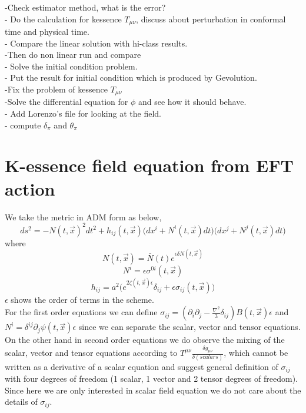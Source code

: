 \documentclass[a4paper,11pt]{article}
\def\be{\begin{equation}}
\def\ee{\end{equation}}
\begin{document}
-Check estimator method, what is the error? \\
- Do the calculation for  kessence $T_{\mu \nu}$, discuss about perturbation in conformal time and physical time. \\
- Compare the linear solution with hi-class results. \\
-Then do non linear run and compare \\
- Solve the initial condition problem. \\
- Put the result for initial condition which is produced by Gevolution. \\
-Fix the problem of kessence $T_{\mu \nu}$ \\
-Solve the differential equation for $\phi$ and see how it should behave. \\
- Add Lorenzo's file for looking at the field. \\
- compute $\delta_{\pi}$ and $\theta_{\pi}$ \\

 \section{K-essence field equation from EFT action}
 
 We take the metric in ADM form as below,
  \be
  ds^2= -N (t,\vec{x}) ^2 d t^2+ h_{ij } (t,\vec{x}) \Big( dx^i+N^i (t,\vec{x}) dt   \Big) \Big( dx^j+N^j (t,\vec{x}) dt   \Big)
  \ee
  where 
  \be
  N(t,\vec{x})= \bar{N} (t) e^{\epsilon \delta N (t,\vec{x})}
  \ee
  \be
  N^i=\epsilon \sigma^{0i} (t,\vec{x})
  \ee
  \be
    h_{ij}=a^2 \Big( e^{2 \zeta (t,\vec{x}) \epsilon} \delta_{ij} + \epsilon \sigma_{ij} (t,\vec{x})   \Big)
  \ee
  $\epsilon$ shows the order of terms in the scheme.\\
  For the first order equations we can define $\sigma_{ij}=(\partial_i \partial_j- \frac{\nabla^2}{3} \delta_{ij}) B(t,\vec{x}) \epsilon$ and $N^i=\delta ^{ij} \partial_j \psi (t,\vec{x}) \epsilon$  since we can separate the scalar, vector and tensor equations. \\
  On the other hand in second order equations we do observe the mixing of the scalar, vector and tensor equations according to $ T^{\mu \nu} \frac{\delta g_{\mu \nu}}{\delta (scalars)}$, which cannot be written as a derivative of a scalar equation and suggest general definition of  $\sigma_{ij}$ with four degrees of freedom (1 scalar, 1 vector and 2 tensor degrees of freedom). Since here we are only interested in  scalar field equation we do not care about the details of $\sigma_{ij}$.
\end{document}
